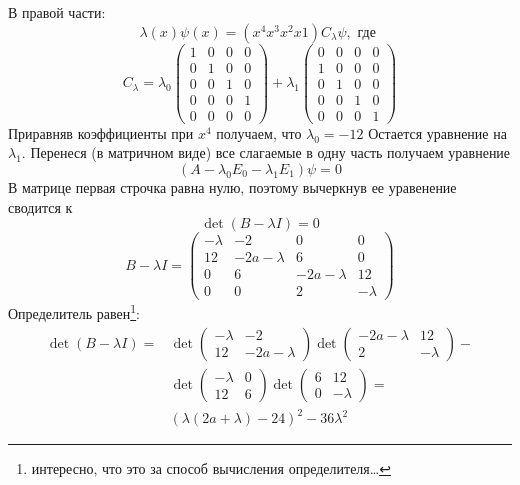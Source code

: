 В правой части:
$$ \lambda(x) \psi(x) = (x^4 x^3 x^2 x 1) C_\lambda \psi, \text{ где }$$
\begin{equation}
C_\lambda = \lambda_0 \begin{pmatrix} 1 & 0 & 0 & 0 \\ 0 & 1 & 0 & 0 \\ 0 & 0 &1 &0\\ 0 & 0 & 0 & 1 \\ 0 & 0 & 0 & 0 \end{pmatrix} + \lambda_1 \begin{pmatrix} 0 & 0 & 0 & 0  \\ 1 & 0 & 0 & 0 \\ 0 & 1 & 0 & 0 \\ 0 & 0 &1 &0\\ 0 & 0 & 0 & 1\end{pmatrix}
\end{equation}
Приравняв коэффициенты при $x^4$ получаем, что $\lambda_0 = -12$
Остается уравнение на $\lambda_1$. Перенеся (в матричном виде) все слагаемые в одну часть получаем уравнение
$$(A-\lambda_0E_0 - \lambda_1E_1)\psi = 0$$
В матрице первая строчка равна нулю, поэтому вычеркнув ее уравенение сводится к
$$\det (B-\lambda I) = 0$$
$$B - \lambda I = \begin{pmatrix} -\lambda & -2 & 0 & 0 \\ 12 & -2a - \lambda & 6 & 0 \\ 0 & 6 & -2a - \lambda & 12 \\ 0 & 0 & 2 & -\lambda \end{pmatrix}$$
Определитель равен\footnote{интересно, что это за способ вычисления определителя…}:
\begin{equation}
\begin{split}
\det (B-\lambda I) = &\det \begin{pmatrix} -\lambda & -2 \\ 12 & -2a - \lambda \end{pmatrix}\det\begin{pmatrix}
-2a - \lambda & 12 \\ 2 & -\lambda\end{pmatrix} - \\
&\det \begin{pmatrix} -\lambda & 0 \\ 12 & 6 \end{pmatrix} \det \begin{pmatrix} 6 & 12 \\ 0 & -\lambda \end{pmatrix}=\\
& (\lambda(2a+\lambda) - 24)^2 - 36 \lambda^2 
\end{split}
\end{equation}

